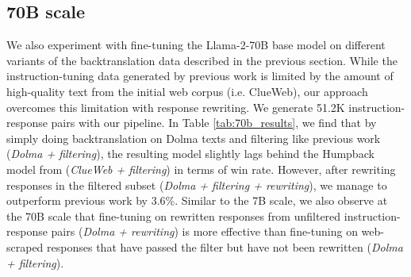 \subsection{70B scale}
We also experiment with fine-tuning the Llama-2-70B base model on different variants of the backtranslation data described in the previous section. While the instruction-tuning data generated by previous work \cite{li2023self} is limited by the amount of high-quality text from the initial web corpus (i.e. ClueWeb), our approach overcomes this limitation with response rewriting. We generate 51.2K instruction-response pairs with our pipeline. In Table \ref{tab:70b_results}, we find that by simply doing backtranslation on Dolma texts and filtering like previous work (\textit{Dolma + filtering}), the resulting model slightly lags behind the Humpback model from \cite{li2023self} (\textit{ClueWeb + filtering}) in terms of win rate. However, after rewriting responses in the filtered subset (\textit{Dolma + filtering + rewriting}), we manage to outperform previous work by 3.6\%. Similar to the 7B scale, we also observe at the 70B scale that fine-tuning on rewritten responses from unfiltered instruction-response pairs (\textit{Dolma + rewriting}) is more effective than fine-tuning on web-scraped responses that have passed the filter but have not been rewritten (\textit{Dolma + filtering}).
